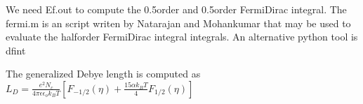 \documentclass[letterpaper,10pt,english]{sphinxmanual}
\begin{document}
\sphinxAtStartPar
We need Ef.out to compute the \sphinxhyphen{}0.5\sphinxhyphen{}order and 0.5\sphinxhyphen{}order Fermi\sphinxhyphen{}Dirac integral. The fermi.m is an script writen
by Natarajan and Mohankumar that may be used to evaluate the half\sphinxhyphen{}order Fermi\sphinxhyphen{}Dirac integral integrals. An alternative
python tool is dfint

\begin{sphinxVerbatim}[commandchars=\\\{\}]
  
\end{sphinxVerbatim}

\sphinxAtStartPar
The generalized Debye length is computed as \(L_D = \frac{e^2 N_c}{4 \pi \epsilon \epsilon_o k_B T }\left[F_{-1/2}(\eta) + \frac{15\alpha k_B T}{4}F_{1/2}(\eta)\right]\)
\end{document}
